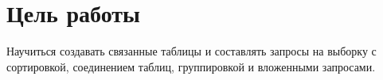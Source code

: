 \section{Цель работы}
Научиться создавать связанные таблицы и составлять запросы на выборку с сортировкой,
соединением таблиц, группировкой и вложенными запросами. \bbtLabGoal
